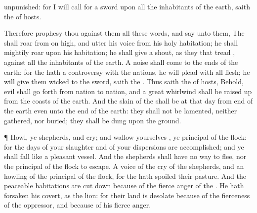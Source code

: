 {unpunished: for I will
call for a
sword upon all the
inhabitants of the
earth,
saith the
{} of
hosts.
\par }{\PP {}Therefore
prophesy thou against them all these
words, and
say unto them, The
{} shall
roar from on
high, and
utter his
voice from his
holy
habitation; he shall
mightily
roar upon his
habitation; he shall
give a
shout, as they that
tread
{}, against all the
inhabitants of the
earth.
A
noise shall
come
{} to the
ends of the
earth; for the
{} hath a
controversy with the
nations, he will
plead with all
flesh; he will
give them
{}
wicked to the
sword,
saith the
{}.
Thus
saith the
{} of
hosts, Behold,
evil shall go
forth from
nation to
nation, and a
great
whirlwind shall be raised
up from the
coasts of the
earth.
And the
slain of the
{} shall be at that
day from
{}
end of the
earth even unto the
{}
end of the
earth: they shall not be
lamented, neither
gathered, nor
buried; they shall be
dung
upon the
ground.
\par }{\PP {}¶
Howl, ye
shepherds, and
cry; and
wallow yourselves
{}, ye
principal of the
flock: for the
days of your
slaughter and of your
dispersions are
accomplished; and ye shall
fall like a
pleasant
vessel.
And the
shepherds shall have no
way to
flee, nor the
principal of the
flock to
escape.
A
voice of the
cry of the
shepherds, and an
howling of the
principal of the
flock,
{} for the
{} hath
spoiled their
pasture.
And the
peaceable
habitations are cut
down
because of the
fierce
anger of the
{}.
He hath
forsaken his
covert, as the
lion: for their
land is
desolate
because of the
fierceness of the
oppressor, and
because of his
fierce
anger.

}
